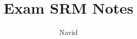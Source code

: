 \documentclass[12pt]{article}
\begin{document}
 
 
 
\title{Exam SRM Notes}%
\author{Navid} %
 
\maketitle
 





 
 
\end{document}
